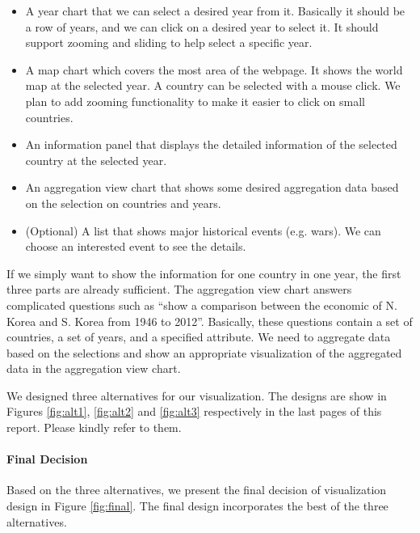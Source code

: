 \documentclass[12pt, fullpage,letterpaper]{article}
\begin{document}
\begin{itemize}
    \item A year chart that we can select a desired year from it.
        Basically it should be a row of years, and we can click on a desired year to select it.
        It should support zooming and sliding to help select a specific year.
    \item A map chart which covers the most area of the webpage.
        It shows the world map at the selected year.
        A country can be selected with a mouse click.
        We plan to add zooming functionality to make it easier to click on small countries.
    \item An information panel that displays the detailed information of the selected country at the selected year.
    \item An aggregation view chart that shows some desired aggregation data based on the selection on countries and years.
    \item (Optional) A list that shows major historical events (e.g. wars). We can choose an interested event to see the details.
\end{itemize}

If we simply want to show the information for one country in one year, the
first three parts are already sufficient. The aggregation view chart answers
complicated questions such
as ``show a comparison between the economic of N. Korea and S. Korea from 1946
to 2012''.  Basically, these questions contain a set of countries, a set of
years, and a specified attribute.  We need to aggregate data based on the
selections and show an appropriate visualization of the aggregated data in the
aggregation view chart.

We designed three alternatives for our visualization.  The designs are show in
Figures \ref{fig:alt1}, \ref{fig:alt2} and \ref{fig:alt3} respectively in the
last pages of this report.  Please kindly refer to them.

\paragraph{Final Decision}

Based on the three alternatives, we present the final decision of visualization
design in Figure \ref{fig:final}. The final design incorporates the best
of the three alternatives.
\end{document}
